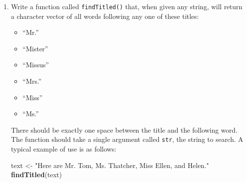 \documentclass[]{book}
\makeatletter
\newenvironment{Shaded}{\begin{snugshade}}{\end{snugshade}}
\newcommand{\KeywordTok}[1]{\textcolor[rgb]{0.13,0.29,0.53}{\textbf{{#1}}}}
\newcommand{\StringTok}[1]{\textcolor[rgb]{0.31,0.60,0.02}{{#1}}}
\newcommand{\NormalTok}[1]{{#1}}
\providecommand{\tightlist}{%
  \setlength{\itemsep}{0pt}\setlength{\parskip}{0pt}}
\newenvironment{kframe}{%
\medskip{}
\setlength{\fboxsep}{.8em}
 \def\at@end@of@kframe{}%
 \ifinner\ifhmode%
  \def\at@end@of@kframe{\end{minipage}}%
  \begin{minipage}{\columnwidth}%
 \fi\fi%
 \def\FrameCommand##1{\hskip\@totalleftmargin \hskip-\fboxsep
 \colorbox{shadecolor}{##1}\hskip-\fboxsep
     \hskip-\linewidth \hskip-\@totalleftmargin \hskip\columnwidth}%
 \MakeFramed {\advance\hsize-\width
   \@totalleftmargin\z@ \linewidth\hsize
   \@setminipage}}%
 {\par\unskip\endMakeFramed%
 \at@end@of@kframe}
\renewenvironment{Shaded}{\begin{kframe}}{\end{kframe}}
\theoremstyle{definition}
\theoremstyle{definition}
\theoremstyle{remark}
\makeatother
\begin{document}
{\begin{enumerate}
  \begin{itemize}
  \tightlist
  \item
    \emph{box} and \emph{bat}. Regex string: \texttt{"b{[}oa{]}t"}.
    (This is the one to submit, because it's shorter than other
    alternatives such as\texttt{"box\textbar{}bat"}).
  \item
    \emph{cart} and \emph{cars} and \emph{carp}.
  \item
    \emph{slick} and \emph{sick}
  \item
    Any word ending in \emph{ity} (such as \emph{velocity} and
    \emph{ferocity}). Be sure to pay attention to word-boundaries. You
    should match \emph{velocity} but not \emph{~velocity} (includes a
    space before the ``v'') or \emph{velocity;}.
  \item
    A whole number consisting of more than six digits.
  \item
    A word that is between 3 and 6 characters long. Pay attention to
    word-boundaries.
  \item
    One or more whitespace characters, followed by a hyphen or a
    semicolon or a colon.
  \end{itemize}
\item
  Write a function called \texttt{findTitled()} that, when given any
  string, will return a character vector of all words following any one
  of these titles:

  \begin{itemize}
  \tightlist
  \item
    ``Mr.''
  \item
    ``Mister''
  \item
    ``Missus''
  \item
    ``Mrs.''
  \item
    ``Miss''
  \item
    ``Ms.''
  \end{itemize}

  There should be exactly one space between the title and the following
  word. The function should take a single argument called \texttt{str},
  the string to search. A typical example of use is as follows:

\begin{Shaded}
\begin{Highlighting}[]
\NormalTok{text <-}\StringTok{ "Here are Mr. Tom, Ms. Thatcher, Miss Ellen, and Helen."}
\KeywordTok{findTitled}\NormalTok{(text)}
\end{Highlighting}
\end{Shaded}


\end{enumerate}}
\end{document}
